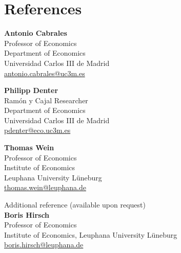 \documentclass[11pt,a4paper]{article}
\newcommand{\referee}[5][0.31\linewidth]{\begin{minipage}[t]{#1}\raggedright\small
  \textbf{#2}\\#3\\#4\\\href{mailto:#5}{#5}\end{minipage}}
\begin{document}
\section{References}
\noindent
\referee{Antonio Cabrales}{Professor of Economics}
  {Department of Economics\\Universidad Carlos III de Madrid}{antonio.cabrales@uc3m.es}\hfill
\referee{Philipp Denter}{Ramón y Cajal Researcher}
  {Department of Economics\\Universidad Carlos III de Madrid}{pdenter@eco.uc3m.es}\hfill
\referee{Thomas Wein}{Professor of Economics}
  {Institute of Economics\\Leuphana University Lüneburg}{thomas.wein@leuphana.de}

\vspace{2.2ex}
{\footnotesize\color{muted}Additional reference (available upon request)}\\[0.6ex]
{\footnotesize
\textbf{Boris Hirsch}\\
Professor of Economics\\
Institute of Economics, Leuphana University Lüneburg\\
\href{mailto:boris.hirsch@leuphana.de}{boris.hirsch@leuphana.de}}
\end{document}
